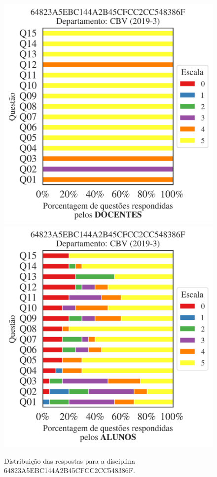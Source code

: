 \documentclass[a4paper,10pt]{article}
\begin{document}
\begin{figure}[h]
\centering
\includegraphics[width=0.485\linewidth]{analise_disciplina_departamento_CBV_64823A5EBC144A2B45CFCC2CC548386F_docentes.png}
\includegraphics[width=0.485\linewidth]{analise_disciplina_departamento_CBV_64823A5EBC144A2B45CFCC2CC548386F_alunos.png}
\caption{\label{fig:analise_geral_departamento}                Distribuição das respostas para a disciplina 64823A5EBC144A2B45CFCC2CC548386F. }
\end{figure}
\end{document}

